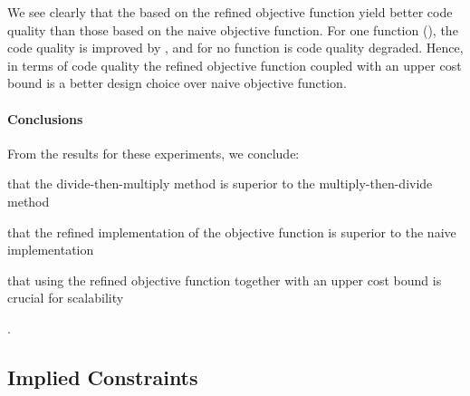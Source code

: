 We see clearly that the  based on the refined
\gls{objective function} yield better code quality than those based on the naive
\gls{objective function}.
%
For one \gls{function} (), the code quality is improved by
\printZCNorm{%
  \ObjFunRefinedVsNaiveCyclesSpeedupRefinedVsNaiveWLbUbCyclesZeroCenteredSpeedupMax%
}, and for no \gls{function} is code quality degraded.
%
Hence, in terms of code quality the refined \gls{objective function} coupled
with an upper cost bound is a better design choice over naive \gls{objective
  function}.


\paragraph{Conclusions}

From the results for these experiments, we conclude:
%
\begin{enumerate*}[label=(\roman*), itemjoin={;\ }, itemjoin*={; and\ }]
  \item that the \gls{divide-then-multiply method} is superior to the
    \gls{multiply-then-divide method}
  \item that the refined implementation of the \gls{objective function} is
    superior to the naive implementation
  \item that using the refined \gls{objective function} together with an upper
    cost bound is crucial for scalability
\end{enumerate*}.


\subsection{Implied Constraints}




